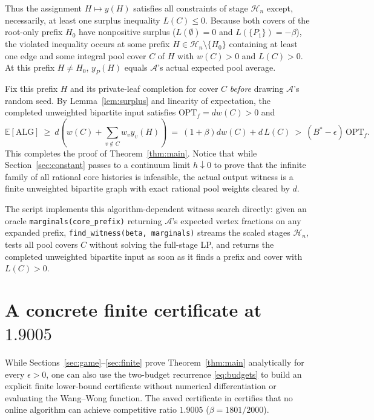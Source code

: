 \documentclass[11pt,letterpaper]{article}
\begin{document}
Thus the assignment $H\mapsto y(H)$ satisfies all constraints of stage $\mathcal H_n$ except, necessarily, at least one surplus inequality $L(C)\le 0$. Because both covers of the root-only prefix $H_0$ have nonpositive surplus ($L(\emptyset)=0$ and $L(\{P_1\})=-\beta$), the violated inequality occurs at some prefix $H\in\mathcal H_n\setminus\{H_0\}$ containing at least one edge and some integral pool cover $C$ of $H$ with $w(C)>0$ and $L(C)>0$. At this prefix $H\neq H_0$, $y_P(H)$ equals $\mathcal A$'s actual expected pool average.

Fix this prefix $H$ and its private-leaf completion for cover $C$ \emph{before} drawing $\mathcal A$'s random seed. By Lemma~\ref{lem:surplus} and linearity of expectation, the completed unweighted bipartite input satisfies $\mathrm{OPT}_f = d w(C) > 0$ and
\[
  \mathbb E[\mathrm{ALG}]\ \ge\ d\left(w(C) + \sum_{v\notin C} w_v y_v(H)\right)
  \ =\ (1+\beta)d w(C) + d\,L(C)\ >\ (B^*-\epsilon)\,\mathrm{OPT}_f.
\]
This completes the proof of Theorem~\ref{thm:main}. Notice that while Section~\ref{sec:constant} passes to a continuum limit $h\downarrow 0$ to prove that the infinite family of all rational core histories is infeasible, the actual output witness is a finite unweighted bipartite graph with exact rational pool weights cleared by $d$.

The script  implements this algorithm-dependent witness search directly: given an oracle \texttt{marginals(core\_prefix)} returning $\mathcal A$'s expected vertex fractions on any expanded prefix, \texttt{find\_witness(beta, marginals)} streams the scaled stages $\mathcal H_n$, tests all pool covers $C$ without solving the full-stage LP, and returns the completed unweighted bipartite input as soon as it finds a prefix and cover with $L(C)>0$.

\appendix
\section{A concrete finite certificate at \texorpdfstring{$1.9005$}{1.9005}}\label{sec:certificate}

While Sections~\ref{sec:game}--\ref{sec:finite} prove Theorem~\ref{thm:main} analytically for every $\epsilon>0$, one can also use the two-budget recurrence \eqref{eq:budgets} to build an explicit finite lower-bound certificate without numerical differentiation or evaluating the Wang--Wong function. The saved certificate in  certifies that no online algorithm can achieve competitive ratio $1.9005$ ($\beta = 1801/2000$).
\end{document}
